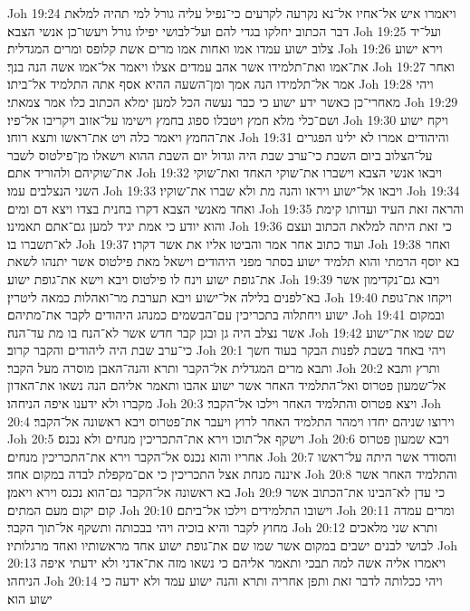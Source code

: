 Joh 19:24  ויאמרו איש אל־אחיו אל־נא נקרעה לקרעים כי־נפיל עליה גורל למי תהיה למלאת דבר הכתוב יחלקו בגדי להם ועל־לבושי יפילו גורל ויעשו־כן אנשי הצבא׃
Joh 19:25  ועל־יד צלוב ישוע עמדו אמו ואחות אמו מרים אשת קלופס ומרים המגדלית׃
Joh 19:26  וירא ישוע את־אמו ואת־תלמידו אשר אהב עמדים אצלו ויאמר אל־אמו אשה הנה בנך׃
Joh 19:27  ואחר אמר אל־תלמידו הנה אמך ומן־השעה ההיא אסף אתה התלמיד אל־ביתו׃
Joh 19:28  ויהי מאחרי־כן כאשר ידע ישוע כי כבר נעשה הכל למען ימלא הכתוב כלו אמר צמאתי׃
Joh 19:29  ושם־כלי מלא חמץ ויטבלו ספוג בחמץ וישימו על־אזוב ויקריבו אל־פיו׃
Joh 19:30  ויקח ישוע את־החמץ ויאמר כלה ויט את־ראשו ותצא רוחו׃
Joh 19:31  והיהודים אמרו לא ילינו הפגרים על־הצלוב ביום השבת כי־ערב שבת היה וגדול יום השבת ההוא וישאלו מן־פילטוס לשבר את־שוקיהם ולהוריד אתם׃
Joh 19:32  ויבאו אנשי הצבא וישברו את־שוקי האחד ואת־שוקי השני הנצלבים עמו׃
Joh 19:33  ויבאו אל־ישוע ויראו והנה מת ולא שברו את־שוקיו׃
Joh 19:34  ואחד מאנשי הצבא דקרו בחנית בצדו ויצא דם ומים׃
Joh 19:35  והראה זאת העיד ועדותו קימת והוא יודע כי אמת יגיד למען גם־אתם תאמינו׃
Joh 19:36  כי זאת היתה למלאת הכתוב ועצם לא־תשברו בו׃
Joh 19:37  ועוד כתוב אחר אמר והביטו אליו את אשר דקרו׃
Joh 19:38  ואחר בא יוסף הרמתי והוא תלמיד ישוע בסתר מפני היהודים וישאל מאת פילטוס אשר יתנהו לשאת את־גופת ישוע וינח לו פילטוס ויבא וישא את־גופת ישוע׃
Joh 19:39  ויבא גם־נקדימון אשר בא־לפנים בלילה אל־ישוע ויבא תערבת מר־ואהלות כמאה ליטרין׃
Joh 19:40  ויקחו את־גופת ישוע ויחתלוה בתכריכין עם־הבשמים כמנהג היהודים לקבר את־מתיהם׃
Joh 19:41  ובמקום אשר נצלב היה גן ובגן קבר חדש אשר לא־הנח בו מת עד־הנה׃
Joh 19:42  שם שמו את־ישוע כי־ערב שבת היה ליהודים והקבר קרוב׃
Joh 20:1  ויהי באחד בשבת לפנות הבקר בעוד חשך ותבא מרים המגדלית אל־הקבר ותרא והנה־האבן מוסרה מעל הקבר׃
Joh 20:2  ותרץ ותבא אל־שמעון פטרוס ואל־התלמיד האחר אשר ישוע אהבו ותאמר אליהם הנה נשאו את־האדון מקברו ולא ידענו איפה הניחהו׃
Joh 20:3  ויצא פטרוס והתלמיד האחר וילכו אל־הקבר׃
Joh 20:4  וירוצו שניהם יחדו וימהר התלמיד האחר לרוץ ויעבר את־פטרוס ויבא ראשונה אל־הקבר׃
Joh 20:5  וישקף אל־תוכו וירא את־התכריכין מנחים ולא נכנס׃
Joh 20:6  ויבא שמעון פטרוס אחריו והוא נכנס אל־הקבר וירא את־התכריכין מנחים׃
Joh 20:7  והסודר אשר היתה על־ראשו איננה מנחת אצל התכריכין כי אם־מקפלת לבדה במקום אחד׃
Joh 20:8  והתלמיד האחר אשר בא ראשונה אל־הקבר גם־הוא נכנס וירא ויאמן׃
Joh 20:9  כי עדן לא־הבינו את־הכתוב אשר קום יקום מעם המתים׃
Joh 20:10  וישובו התלמידים וילכו אל־ביתם׃
Joh 20:11  ומרים עמדה מחוץ לקבר והיא בוכיה ויהי בבכותה ותשקף אל־תוך הקבר׃
Joh 20:12  ותרא שני מלאכים לבושי לבנים ישבים במקום אשר שמו שם את־גופת ישוע אחד מראשותיו ואחד מרגלותיו׃
Joh 20:13  ויאמרו אליה אשה למה תבכי ותאמר אליהם כי נשאו מזה את־אדני ולא ידעתי איפה הניחהו׃
Joh 20:14  ויהי ככלותה לדבר זאת ותפן אחריה ותרא והנה ישוע עמד ולא ידעה כי ישוע הוא׃
